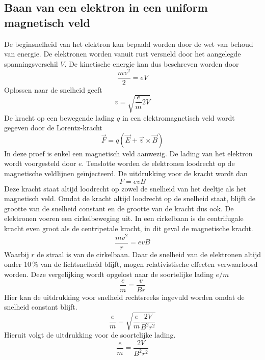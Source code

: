 
\subsection{Baan van een elektron in een uniform magnetisch veld}

De beginsnelheid van het elektron kan bepaald worden door de wet van behoud van 
energie. De elektronen worden vanuit rust versneld door het aangelegde 
spanningsverschil $V$. De kinetische energie kan dus beschreven worden door
$$
\frac{mv^2}{2} = eV
$$
Oplossen naar de snelheid geeft
$$
v = \sqrt{ \frac{e}{m} 2V }
$$
De kracht op een bewegende lading $q$ in een elektromagnetisch veld wordt 
gegeven door de Lorentz-kracht
$$
\vec{F} = q(\vec{E} + \vec{v} \times \vec{B})
$$
In deze proef is enkel een magnetisch veld aanwezig. De lading van het elektron 
wordt voorgesteld door $e$. Tenslotte worden de elektronen loodrecht op de 
magnetische veldlijnen ge\"injecteerd. De uitdrukking voor de kracht wordt dan
$$
F = e v B
$$
Deze kracht staat altijd loodrecht op zowel de snelheid van het deeltje als het 
magnetisch veld. Omdat de kracht altijd loodrecht op de snelheid staat, blijft 
de grootte van de snelheid constant en de grootte van de kracht dus ook. De 
elektronen voeren een cirkelbeweging uit. In een cirkelbaan is de centrifugale 
kracht even groot als de centripetale kracht, in dit geval de magnetische 
kracht.
$$
\frac{mv^2}{r} = evB
$$
Waarbij $r$ de straal is van de cirkelbaan.
Daar de snelheid van de elektronen altijd onder 10\,\% van de lichtsnelheid 
blijft, mogen relativistische effecten verwaarloosd worden. Deze vergelijking 
wordt opgelost naar de soortelijke lading $e/m$
$$
\frac{e}{m} = \frac{v}{Br}
$$
Hier kan de uitdrukking voor snelheid rechtsreeks ingevuld worden omdat de 
snelheid constant blijft.
$$
\frac{e}{m} = \sqrt{\frac{e}{m} \frac{2V}{B^2r^2}}
$$
Hieruit volgt de uitdrukking voor de soortelijke lading.
$$
\frac{e}{m} = \frac{2V}{B^2r^2}
$$
